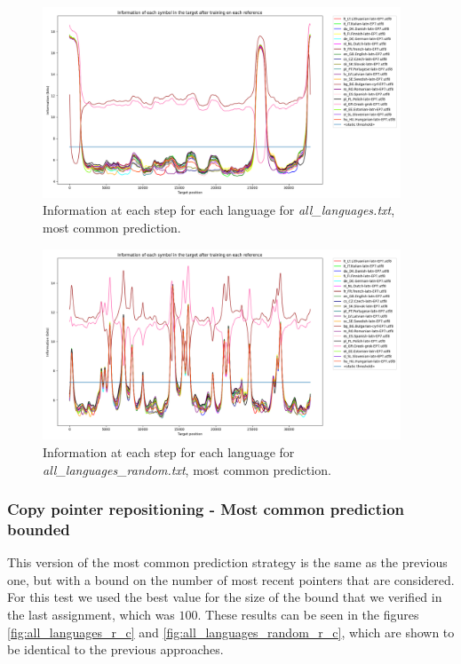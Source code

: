 \documentclass{article}
\begin{document}
\begin{figure}
    \centering
    \includegraphics[width=0.95\textwidth]{../results/all_languages/-r_m.png}
    \caption{Information at each step for each language for \textit{all\_languages.txt}, most common prediction.}
    \label{fig:all_languages_r_m}
\end{figure}

\begin{figure}
    \centering
    \includegraphics[width=0.95\textwidth]{../results/all_languages_random/-r_m.png}
    \caption{Information at each step for each language for \textit{all\_languages\_random.txt}, most common prediction.}
    \label{fig:all_languages_random_r_m}
\end{figure}

\subsubsection{Copy pointer repositioning - Most common prediction bounded}
\label{subsubsec:results_locate_lang_most_common_prediction_bounded}

This version of the most common prediction strategy is the same as the previous one, but with a bound on the number of most recent pointers that are considered.
For this test we used the best value for the size of the bound that we verified in the last assignment, which was $100$.
These results can be seen in the figures \ref{fig:all_languages_r_c} and \ref{fig:all_languages_random_r_c}, which are shown to be identical to the previous approaches.
\end{document}
